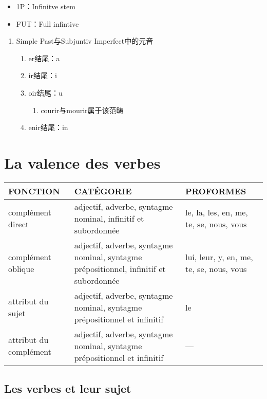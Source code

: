\documentclass[UTF8]{report}
\begin{document}
\begin{itemize}
    \item 1P：Infinitve stem
    \item FUT：Full infintive
\end{itemize}

\begin{enumerate}
    \item Simple Past与Subjuntiv Imperfect中的元音
    \begin{enumerate}
        \item er结尾：a 
        \item ir结尾：i 
        \item oir结尾：u 
        \begin{enumerate}
            \item courir与mourir属于该范畴
        \end{enumerate}
        \item enir结尾：in
    \end{enumerate}
\end{enumerate}

\section{La valence des verbes}


\begin{table}[H]
    \centering
    \begin{tabular}{>{\RaggedRight}p{3cm} >{\RaggedRight}p{6.5cm} >{\RaggedRight}p{4cm}}
    \toprule
    \textbf{FONCTION} & \textbf{CATÉGORIE} & \textbf{PROFORMES} \\
    \midrule
    complément direct & adjectif, adverbe, syntagme nominal, infinitif et subordonnée & le, la, les, en, me, te, se, nous, vous \\
    \midrule
    complément oblique & adjectif, adverbe, syntagme nominal, syntagme prépositionnel, infinitif et subordonnée & lui, leur, y, en, me, te, se, nous, vous \\
    \midrule
    {attribut du sujet} & adjectif, adverbe, syntagme nominal, syntagme prépositionnel et infinitif & le \\
    \midrule
    attribut du complément & adjectif, adverbe, syntagme nominal, syntagme prépositionnel et infinitif & — \\
    \bottomrule
    \end{tabular}
\end{table}

\subsection{Les verbes et leur sujet}
\end{document}
